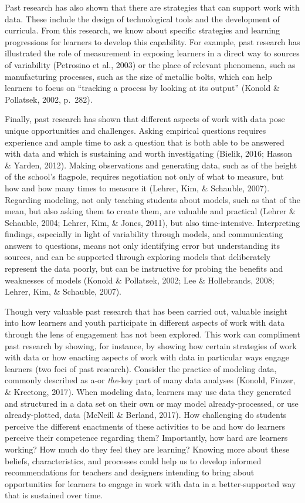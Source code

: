 \documentclass[]{msu-thesis}
\theoremstyle{definition}
\theoremstyle{definition}
\theoremstyle{definition}
\theoremstyle{remark}
\begin{document}
Past research has also shown that there are strategies that can support
work with data. These include the design of technological tools and the
development of curricula. From this research, we know about specific
strategies and learning progressions for learners to develop this
capability. For example, past research has illustrated the role of
measurement in exposing learners in a direct way to sources of
variability (Petrosino et al., 2003) or the place of relevant phenomena,
such as manufacturing processes, such as the size of metallic bolts,
which can help learners to focus on ``tracking a process by looking at
its output'' (Konold \& Pollatsek, 2002, p.~282).

Finally, past research has shown that different aspects of work with
data pose unique opportunities and challenges. Asking empirical
questions requires experience and ample time to ask a question that is
both able to be answered with data and which is sustaining and worth
investigating (Bielik, 2016; Hasson \& Yarden, 2012). Making
observations and generating data, such as of the height of the school's
flagpole, requires negotiation not only of what to measure, but how and
how many times to measure it (Lehrer, Kim, \& Schauble, 2007). Regarding
modeling, not only teaching students about models, such as that of the
mean, but also asking them to create them, are valuable and practical
(Lehrer \& Schauble, 2004; Lehrer, Kim, \& Jones, 2011), but also
time-intensive. Interpreting findings, especially in light of
variability through models, and communicating answers to questions,
means not only identifying error but understanding its sources, and can
be supported through exploring models that deliberately represent the
data poorly, but can be instructive for probing the benefits and
weaknesses of models (Konold \& Pollatsek, 2002; Lee \& Hollebrands,
2008; Lehrer, Kim, \& Schauble, 2007).

Though very valuable past research that has been carried out, valuable
insight into how learners and youth participate in different aspects of
work with data through the lens of engagement has not been explored.
This work can compliment past research by showing, for instance, by
showing how certain strategies of work with data or how enacting aspects
of work with data in particular ways engage learners (two foci of past
research). Consider the practice of modeling data, commonly described as
a-or \emph{the}-key part of many data analyses (Konold, Finzer, \&
Kreetong, 2017). When modeling data, learners may use data they
generated and structured in a data set on their own or may model
already-processed, or use already-plotted, data (McNeill \& Berland,
2017). How challenging do students perceive the different enactments of
these activities to be and how do learners perceive their competence
regarding them? Importantly, how hard are learners working? How much do
they feel they are learning? Knowing more about these beliefs,
characteristics, and processes could help us to develop informed
recommendations for teachers and designers intending to bring about
opportunities for learners to engage in work with data in a
better-supported way that is sustained over time.
\end{document}
